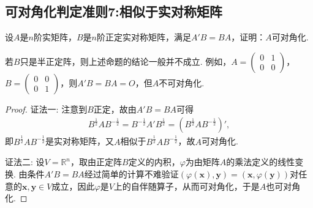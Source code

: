 \documentclass[../../main.tex]{subfiles}
\begin{document}
\subsection{可对角化判定准则7:相似于实对称矩阵}

\begin{proposition}\label{proposition:例9.72}
设\(A\)是\(n\)阶实矩阵，\(B\)是\(n\)阶正定实对称矩阵，满足\(A'B = BA\)，证明：\(A\)可对角化.
\end{proposition}
\begin{remark}
若\(B\)只是半正定阵，则上述命题的结论一般并不成立. 例如，\(A=\begin{pmatrix}0&1\\0&0\end{pmatrix}\)，\(B=\begin{pmatrix}0&0\\0&1\end{pmatrix}\)，则\(A'B = BA = O\)，但\(A\)不可对角化. 
\end{remark}
\begin{proof}
{\color{blue}证法一:}
注意到\(B\)正定，故由\(A'B = BA\)可得
\begin{align*}
B^{\frac{1}{2}}AB^{-\frac{1}{2}}=B^{-\frac{1}{2}}A'B^{\frac{1}{2}}=(B^{\frac{1}{2}}AB^{-\frac{1}{2}})',
\end{align*}
即\(B^{\frac{1}{2}}AB^{-\frac{1}{2}}\)是实对称矩阵，又\(A\)相似于\(B^{\frac{1}{2}}AB^{-\frac{1}{2}}\)，故\(A\)可对角化.

{\color{blue}证法二:}
设\(V = \mathbb{R}^n\)，取由正定阵\(B\)定义的内积，\(\varphi\)为由矩阵\(A\)的乘法定义的线性变换. 由条件\(A'B = BA\)经过简单的计算不难验证\((\varphi(\boldsymbol{x}),\boldsymbol{y}) = (\boldsymbol{x},\varphi(\boldsymbol{y}))\)对任意的\(\boldsymbol{x},\boldsymbol{y}\in V\)成立，因此\(\varphi\)是\(V\)上的自伴随算子，从而可对角化，于是\(A\)也可对角化.

\end{proof}
\end{document}
